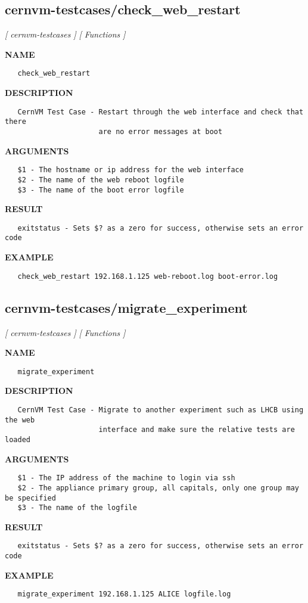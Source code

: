 \subsection{cernvm-testcases/check\_web\_restart}
\textsl{[ cernvm-testcases ]}
\textsl{[ Functions ]}

\label{ch:robo23}
\label{ch:cernvm_testcases_check_web_restart}
\textbf{NAME}
\begin{verbatim}
   check_web_restart
\end{verbatim}
\textbf{DESCRIPTION}
\begin{verbatim}
   CernVM Test Case - Restart through the web interface and check that there
                      are no error messages at boot
\end{verbatim}
\textbf{ARGUMENTS}
\begin{verbatim}
   $1 - The hostname or ip address for the web interface
   $2 - The name of the web reboot logfile
   $3 - The name of the boot error logfile
\end{verbatim}
\textbf{RESULT}
\begin{verbatim}
   exitstatus - Sets $? as a zero for success, otherwise sets an error code
\end{verbatim}
\textbf{EXAMPLE}
\begin{verbatim}
   check_web_restart 192.168.1.125 web-reboot.log boot-error.log
\end{verbatim}
\newpage
\subsection{cernvm-testcases/migrate\_experiment}
\textsl{[ cernvm-testcases ]}
\textsl{[ Functions ]}

\label{ch:robo24}
\label{ch:cernvm_testcases_migrate_experiment}
\textbf{NAME}
\begin{verbatim}
   migrate_experiment
\end{verbatim}
\textbf{DESCRIPTION}
\begin{verbatim}
   CernVM Test Case - Migrate to another experiment such as LHCB using the web
                      interface and make sure the relative tests are loaded 
\end{verbatim}
\textbf{ARGUMENTS}
\begin{verbatim}
   $1 - The IP address of the machine to login via ssh
   $2 - The appliance primary group, all capitals, only one group may be specified
   $3 - The name of the logfile
\end{verbatim}
\textbf{RESULT}
\begin{verbatim}
   exitstatus - Sets $? as a zero for success, otherwise sets an error code
\end{verbatim}
\textbf{EXAMPLE}
\begin{verbatim}
   migrate_experiment 192.168.1.125 ALICE logfile.log
\end{verbatim}
\newpage
